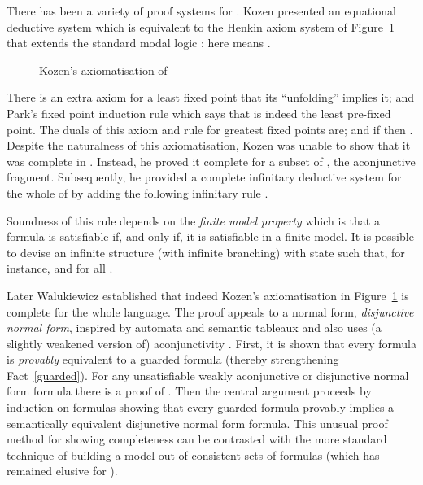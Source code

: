 \documentclass[copyright,creativecommons]{eptcs}
\def\w{\emph}
\begin{document}
There has been a variety of proof systems for . Kozen presented
an equational deductive system which is equivalent to the  
Henkin  axiom system  of Figure~\ref{axiom} that extends 
the standard modal logic  \cite{Koz83}: here 
means . 
\begin{figure}



\caption{Kozen's axiomatisation of }
\label{axiom}
\end{figure}
There is an extra axiom for a  least fixed point that its ``unfolding''
implies it; and  Park's fixed point induction rule 
which says that  is indeed the least pre-fixed point.
The duals of this axiom and rule for greatest fixed points are;
 and if
 then . Despite the naturalness of this axiomatisation, Kozen was
unable to show that it was complete in \cite{Koz83}. 
Instead, he proved it 
complete for a subset of , the 
aconjunctive fragment. Subsequently, he provided a complete infinitary
deductive system for the whole of   by adding the following 
infinitary rule \cite{Koz86}.


Soundness of this rule depends on the \w{finite model property} which is
that  a formula
is satisfiable if, and only if,  it is satisfiable in a finite model. 
It is possible to devise an infinite structure (with infinite branching)
with  state
 such that, for instance,  and 
 for all .  
 
Later Walukiewicz established that indeed  Kozen's axiomatisation 
in Figure~\ref{axiom} is 
complete for the whole language. The proof appeals to 
a normal form, \w{disjunctive normal form}, 
inspired by automata and semantic tableaux 
and also uses  (a slightly weakened version of)
aconjunctivity \cite{Wal00}. First, it is shown that 
every formula is \w{provably} equivalent to a guarded formula
(thereby strengthening Fact~\ref{guarded}).
For any  unsatisfiable weakly aconjunctive or disjunctive normal 
form formula  there is a proof of . 
Then the central  argument 
proceeds by induction on formulas  showing that every guarded
formula provably implies a semantically equivalent disjunctive normal form
formula. 
This unusual proof method for showing completeness
can be contrasted with the more  standard technique of building a model
out of consistent sets of formulas (which has remained elusive
for ). 
\end{document}
